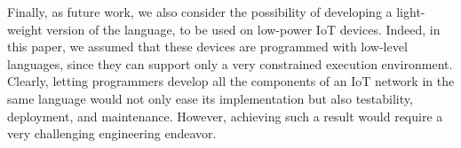 Finally, as future work, we also consider the possibility of developing a
light-weight version of the language, to be used on low-power IoT devices.
Indeed, in this paper, we assumed that these devices are programmed with
low-level languages, since they can support only a very constrained execution
environment. Clearly, letting programmers develop all the components of an IoT
network in the same language would not only ease its implementation but also
testability, deployment, and maintenance. However, achieving such a result
would require a very challenging engineering endeavor.